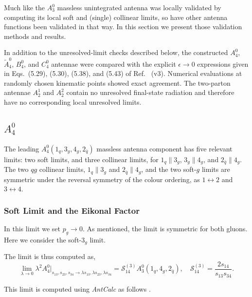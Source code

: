 Much like the $A_3^0$ massless unintegrated antenna was locally validated by computing its local soft and 
(single) collinear limits, so have other antenna functions been validated in that way. In this section 
we present those validation methods and results.

In addition to the unresolved-limit checks described below, the constructed $A_4^0$, $\widetilde A_4^0$, $B_4^0$, and $C_4^0$ antennae were compared with the explicit $\epsilon\to0$ expressions given in Eqs.~(5.29), (5.30), (5.38), and (5.43) of Ref.~\cite{Gehrmann-DeRidder:2005btv} (v3). Numerical evaluations at randomly chosen kinematic points showed exact agreement. The two-parton antennae $A_2^1$ and $A_2^2$ contain no unresolved final-state radiation and therefore have no corresponding local unresolved limits.

\subsection{$A_4^0$}\label{subsec:localValidationA40}

The leading $A_4^0(1_q,3_g,4_g,2_{\bar q})$ massless antenna component has five relevant limits: two soft limits,
and three collinear limits, for $1_q\parallel 3_g$, $3_g\parallel 4_g$, and $2_{\bar q}\parallel 4_g$. The two $qg$ collinear limits, $1_q\parallel 3_g$ and $2_{\bar q}\parallel 4_g$,
and the two soft-$g$ limits are symmetric under the reversal symmetry of the colour 
ordering, as $1\leftrightarrow 2$ and $3\leftrightarrow4$.


\subsubsection{Soft Limit and the Eikonal Factor}

In this limit we set $p_g\to 0$. As mentioned, the limit is symmetric for both gluons. Here we consider the soft-$3_g$ limit.

The limit is thus computed as,
\begin{equation}
    \lim_{\lambda\to 0}\lambda^2 A_4^0\Big|_{s_{13},s_{23},s_{34}\to \lambda s_{13},\lambda s_{23},\lambda s_{34}} = \mathcal S_{14}^{(3)}A_3^0(1_q,4_g,2_{\bar q}),\quad \mathcal S_{14}^{(3)}=\frac{2s_{14}}{s_{13}s_{34}}.
\end{equation}

This limit is computed using \textit{AntCalc} as follows \cite{Gehrmann-DeRidder:2005btv}.

